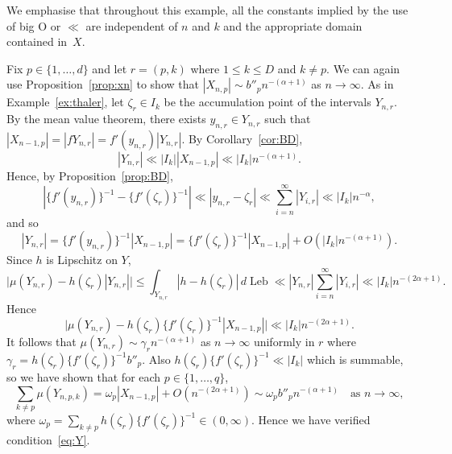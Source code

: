 \documentclass[12pt]{article}
\numberwithin{equation}{section}
\newcommand{\Leb}{\operatorname{Leb}}
\begin{document}
\begin{example}
        We emphasise that throughout this example, all the constants implied by the use of big O or $\ll$ are
        independent of $n$ and $k$ and the appropriate domain contained in~$X$.

  Fix $p\in\{1,\dots,d\}$ and let $r=(p,k)$ where $1\le k\le D$ and $k\neq p$.
  We can again use Proposition~\ref{prop:xn} to show that $| X_{ n,
  p  } | \sim b''_p n^{ -(\alpha + 1) }$ as $n\to\infty$.
  As in Example~\ref{ex:thaler}, let $\zeta_r \in I_k$ be the
  accumulation point of the intervals $Y_{ n,r }$.
  By the mean value theorem, there exists $y_{ n,r } \in Y_{n,r}$ such that
  $|X_{ n-1,p }| = |fY_{n,r}|=f'( y_{ n,r })|Y_{n,r}|$.
  By Corollary~\ref{cor:BD},
\[
    |Y_{n,r}|\ll |I_k| |X_{n-1,p}|\ll |I_k|n^{-(\alpha+1)}.
\]
  Hence, by Proposition~\ref{prop:BD},
  \begin{equation}\label{eq:sum-Yn}
    |  \{f' ( y_{ n,r })\}^{-1} - \{f'( \zeta_r)\}^{-1} |
    \ll | y_{n,r}- \zeta_r |
    \ll \sum_{ i = n }^{ \infty } |Y_{ i, r }|
    \ll |I_k|n^{-\alpha},
  \end{equation}
  and so
        \begin{equation}\label{eq:D>d-Y}
        |Y_{n,r}| = \{f'(y_{n,r})\}^{-1}|X_{n-1,p}|
=\{ f'( \zeta_r )\}^{-1}|X_{ n-1 , p }|+ O( |I_k|n^{-(\alpha+1)}).
        \end{equation}
  Since $h$ is Lipschitz on $Y$,
  \[
    \big| \mu ( Y_{ n, r } ) - h ( \zeta_r) | Y_{ n,r }| \big|
    \leq \int_{ Y_{ n,r } }| h - h ( \zeta_r )| \, d\Leb
    \ll | Y_{ n, r } | \sum_{ i = n }^{ \infty } |Y_{ i, r }|
    \ll |I_k|n^{-(2\alpha+1)}.
  \]
  Hence
\[
    \big| \mu ( Y_{ n, r } ) - h  ( \zeta_r)\{f'(\zeta_r)\}^{-1} | X_{ n-1,p }| \big|
    \ll |I_k|n^{-(2\alpha+1)}.
\]
  It follows that
  $\mu ( Y_{ n,r } ) \sim \gamma_r n^{ -( \alpha + 1) }$
  as $n\to\infty$ uniformly in $r$
  where $\gamma_r=h ( \zeta_r ) \{f'(\zeta_r)\}^{-1}b''_p$.
  Also $h ( \zeta_r ) \{f'(\zeta_r)\}^{-1}\ll |I_k|$ which is summable,
  so we have shown that for each $p\in\{1,\dots,q\}$,
  \[
    \sum_{k\neq p}\mu(Y_{n,p,k})
    =\omega_p|X_{n-1,p}|+O(n^{-(2\alpha+1)})
    \sim\omega_pb''_p n^{-(\alpha+1)}
    \quad\text{as $n\to\infty$},
  \]
  where $\omega_p=\sum_{k\neq p} h( \zeta_r )
  \{f'(\zeta_r)\}^{-1}\in(0,\infty)$.
  Hence
  we have verified condition~\eqref{eq:Y}.


\end{example}
\end{document}
